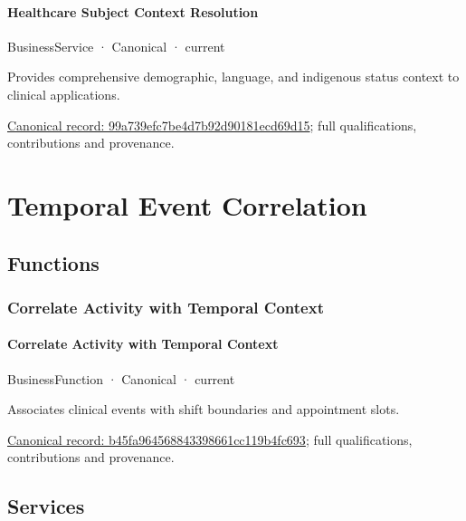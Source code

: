 \paragraph{Healthcare Subject Context Resolution}

\label{element:99a739efc7be4d7b92d90181ecd69d15}
{\small BusinessService · Canonical · current}\par

Provides comprehensive demographic, language, and indigenous status context to clinical applications.


{\footnotesize \href{../../../../continuum/business/business-service/99a739efc7be4d7b92d90181ecd69d15.md}{Canonical record: 99a739efc7be4d7b92d90181ecd69d15}; full qualifications, contributions and provenance.}\par
\section{Temporal Event Correlation}

\subsection{Functions}

\subsubsection{Correlate Activity with Temporal Context}

\paragraph{Correlate Activity with Temporal Context}

\label{element:b45fa964568843398661cc119b4fc693}
{\small BusinessFunction · Canonical · current}\par

Associates clinical events with shift boundaries and appointment slots.


{\footnotesize \href{../../../../continuum/business/business-function/b45fa964568843398661cc119b4fc693.md}{Canonical record: b45fa964568843398661cc119b4fc693}; full qualifications, contributions and provenance.}\par
\subsection{Services}

